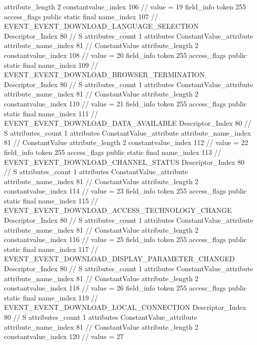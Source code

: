 {{{{{{{					attribute_length	2
					constantvalue_index	106		// value = 19
				}
				}
			}
			field_info {
				token	255
				access_flags	public static final
				name_index	107		// EVENT_EVENT_DOWNLOAD_LANGUAGE_SELECTION
				Descriptor_Index	80		// S
				attributes_count	1
				attributes {
				ConstantValue_attribute {
					attribute_name_index	81		// ConstantValue
					attribute_length	2
					constantvalue_index	108		// value = 20
				}
				}
			}
			field_info {
				token	255
				access_flags	public static final
				name_index	109		// EVENT_EVENT_DOWNLOAD_BROWSER_TERMINATION
				Descriptor_Index	80		// S
				attributes_count	1
				attributes {
				ConstantValue_attribute {
					attribute_name_index	81		// ConstantValue
					attribute_length	2
					constantvalue_index	110		// value = 21
				}
				}
			}
			field_info {
				token	255
				access_flags	public static final
				name_index	111		// EVENT_EVENT_DOWNLOAD_DATA_AVAILABLE
				Descriptor_Index	80		// S
				attributes_count	1
				attributes {
				ConstantValue_attribute {
					attribute_name_index	81		// ConstantValue
					attribute_length	2
					constantvalue_index	112		// value = 22
				}
				}
			}
			field_info {
				token	255
				access_flags	public static final
				name_index	113		// EVENT_EVENT_DOWNLOAD_CHANNEL_STATUS
				Descriptor_Index	80		// S
				attributes_count	1
				attributes {
				ConstantValue_attribute {
					attribute_name_index	81		// ConstantValue
					attribute_length	2
					constantvalue_index	114		// value = 23
				}
				}
			}
			field_info {
				token	255
				access_flags	public static final
				name_index	115		// EVENT_EVENT_DOWNLOAD_ACCESS_TECHNOLOGY_CHANGE
				Descriptor_Index	80		// S
				attributes_count	1
				attributes {
				ConstantValue_attribute {
					attribute_name_index	81		// ConstantValue
					attribute_length	2
					constantvalue_index	116		// value = 25
				}
				}
			}
			field_info {
				token	255
				access_flags	public static final
				name_index	117		// EVENT_EVENT_DOWNLOAD_DISPLAY_PARAMETER_CHANGED
				Descriptor_Index	80		// S
				attributes_count	1
				attributes {
				ConstantValue_attribute {
					attribute_name_index	81		// ConstantValue
					attribute_length	2
					constantvalue_index	118		// value = 26
				}
				}
			}
			field_info {
				token	255
				access_flags	public static final
				name_index	119		// EVENT_EVENT_DOWNLOAD_LOCAL_CONNECTION
				Descriptor_Index	80		// S
				attributes_count	1
				attributes {
				ConstantValue_attribute {
					attribute_name_index	81		// ConstantValue
					attribute_length	2
					constantvalue_index	120		// value = 27
}}}}}}}
